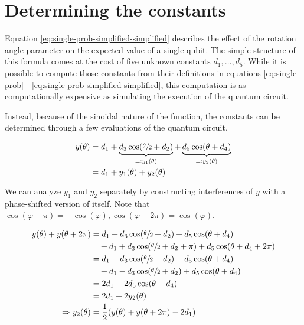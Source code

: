 \section{Determining the constants}
\label{sec:constants}
Equation \ref{eq:single-prob-simplified-simplified} describes the effect of the
rotation angle parameter on the expected value of a single qubit.
The simple structure of this formula comes at the cost of five unknown
constants $d_1, \dots, d_5$.
While it is possible to compute those constants from their definitions in
equations \ref{eq:single-prob} - \ref{eq:single-prob-simplified-simplified},
this computation is as computationally expensive as simulating the execution of
the quantum circuit.

Instead, because of the sinoidal nature of the function, the constants can be
determined through a few evaluations of the quantum circuit.

\begin{equation}
    \label{eq:y}
    \begin{split}
        y(\theta)
            &= d_1 + \underbrace{d_3 \cos(\sfrac\theta2 + d_2)}_{=: y_1(\theta)} + \underbrace{d_5 \cos(\theta + d_4)}_{=: y_2(\theta)}\\
            &= d_1 + y_1(\theta) + y_2(\theta)
    \end{split}
\end{equation}

We can analyze $y_1$ and $y_2$ separately by constructing interferences of $y$
with a phase-shifted version of itself.
Note that
$\cos(\varphi + \pi) = -\cos(\varphi), \cos(\varphi + 2\pi) = \cos(\varphi)$.

\begin{equation}
    \label{eq:d1+y2}
    \begin{split}
        y(\theta) + y(\theta + 2\pi)
            &= d_1 + d_3 \cos(\sfrac\theta2 + d_2) + d_5 \cos(\theta + d_4)\\
                &\quad + d_1 + d_3 \cos(\sfrac\theta2 + d_2 + \pi) + d_5 \cos(\theta + d_4 + 2\pi)\\
            &= d_1 + d_3 \cos(\sfrac\theta2 + d_2) + d_5 \cos(\theta + d_4)\\
                &\quad + d_1 - d_3 \cos(\sfrac\theta2 + d_2) + d_5 \cos(\theta + d_4)\\
            &= 2 d_1 + 2 d_5 \cos(\theta + d_4)\\
            &= 2 d_1 + 2 y_2(\theta)\\
        \Rightarrow y_2(\theta) &= \frac12 (y(\theta) + y(\theta + 2\pi) - 2 d_1)
    \end{split}
\end{equation}

